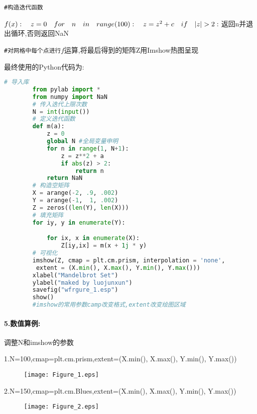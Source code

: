 \documentclass{article}
\begin{document}
    \verb|#构造迭代函数|\par
    $ f(x):\quad  z = 0 \quad for \quad n \quad in \quad range(100):\quad z=z^2+c \quad if \quad |z| > 2:\\
     $返回n并退出循环,否则返回NaN\par 
    
    \verb|#对网格中每个点进行|$f$运算,将最后得到的矩阵Z用Imshow热图呈现
    
    最终使用的Python代码为:\par
    \begin{lstlisting}[language=Python, caption=Python example]
        # 导入库
        from pylab import *
        from numpy import NaN
        # 传入迭代上限次数
        N = int(input())
        # 定义迭代函数
        def m(a):
            z = 0
            global N #全局变量申明
            for n in range(1, N+1):
                z = z**2 + a
                if abs(z) > 2:
                    return n
            return NaN
        # 构造空矩阵
        X = arange(-2, .9, .002)
        Y = arange(-1,  1, .002)
        Z = zeros((len(Y), len(X)))
        # 填充矩阵
        for iy, y in enumerate(Y):

            for ix, x in enumerate(X):
                Z[iy,ix] = m(x + 1j * y)
        # 可视化
        imshow(Z, cmap = plt.cm.prism, interpolation = 'none',
         extent = (X.min(), X.max(), Y.min(), Y.max()))
        xlabel("Mandelbrot Set")
        ylabel("maked by luojunxun")
        savefig("wfrgure_1.esp")
        show()
        #imshow的常用参数camp改变格式,extent改变绘图区域
        \end{lstlisting}
        
    
    \paragraph{5.数值算例:}调整N和imshow的参数\par
    1.N=100,cmap=plt.cm.prism,extent=(X.min(), X.max(), Y.min(), Y.max())\par 
    \begin{figure}[h]
        \centering
        \texttt{[image: Figure\_1.eps]}
        \label{figure_1}
    \end{figure}
    \par \par \par 

    2.N=150,cmap=plt.cm.Blues,extent=(X.min(), X.max(), Y.min(), Y.max())\par 
    \begin{figure}[h]
        \centering
        \texttt{[image: Figure\_2.eps]}
        \label{figure_2}
    \end{figure}
\end{document}
